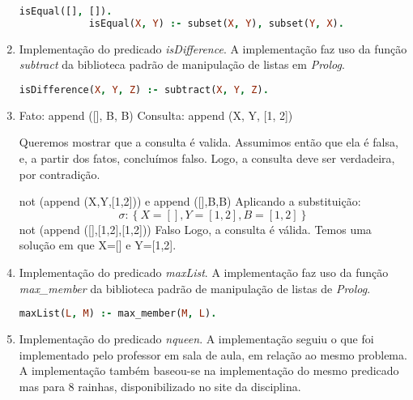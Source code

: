 \documentclass{article}
\begin{document}
\begin{enumerate}
          \begin{lstlisting}[language=Prolog]
            isEqual([], []).
            isEqual(X, Y) :- subset(X, Y), subset(Y, X).
        \end{lstlisting}

    \item

          Implementação do predicado \textit{isDifference}. A implementação faz
          uso
          da função \textit{subtract} da biblioteca padrão de manipulação de
          listas em \textit{Prolog}.

          \begin{lstlisting}[language=Prolog]
            isDifference(X, Y, Z) :- subtract(X, Y, Z).
        \end{lstlisting}

    \item

          Fato: append ([], B, B)
          Consulta: append (X, Y, [1, 2])

          Queremos mostrar que a consulta é valida. Assumimos então que ela é
          falsa, e, a partir dos fatos,
          concluímos falso. Logo, a consulta deve ser verdadeira, por
          contradição.

          not (append (X,Y,[1,2])) e append ([],B,B) \newline
          Aplicando a substituição: \newline
          \[\sigma: \left\{X=[],Y=[1,2],B=[1,2]\right\}\] \newline
          not (append ([],[1,2],[1,2])) \newline
          Falso \newline
          Logo, a consulta é válida.
          Temos uma solução em que X=[] e Y=[1,2].

    \item

          Implementação do predicado \textit{maxList}. A implementação faz uso
          da função \textit{max\_member} da biblioteca padrão de manipulação de
          listas de \textit{Prolog}.

          \begin{lstlisting}[language=Prolog]
            maxList(L, M) :- max_member(M, L).
      \end{lstlisting}

    \item

          Implementação do predicado \textit{nqueen}. A implementação seguiu o
          que foi implementado pelo
          professor em sala de aula, em relação ao mesmo problema. A
          implementação também baseou-se
          na implementação do mesmo predicado mas para 8 rainhas,
          disponibilizado no site da disciplina.


\end{enumerate}
\end{document}
